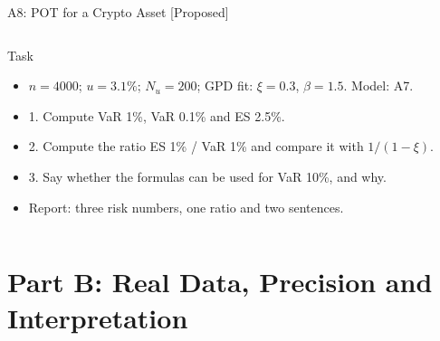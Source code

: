 \begin{frame}{A8: POT for a Crypto Asset [Proposed]}
\propsub
\itemsize{\scriptsize}
\begin{columns}[T]
\begin{column}{\taskw}
\begin{block}{Task}
\begin{itemize}
    \item $n = 4000$; $u = 3.1\%$; $N_u = 200$; GPD fit: $\xi = 0.3$, $\beta = 1.5$. Model: A7.
    \item 1. Compute VaR 1\%, VaR 0.1\% and ES 2.5\%.
    \item 2. Compute the ratio ES 1\% / VaR 1\% and compare it with $1/(1 - \xi)$.
    \item 3. Say whether the formulas can be used for VaR 10\%, and why.
    \item Report: three risk numbers, one ratio and two sentences.
\end{itemize}
\end{block}
\end{column}
\begin{column}{\solw}
\end{column}
\end{columns}
\end{frame}


\section{Part B: Real Data, Precision and Interpretation}


